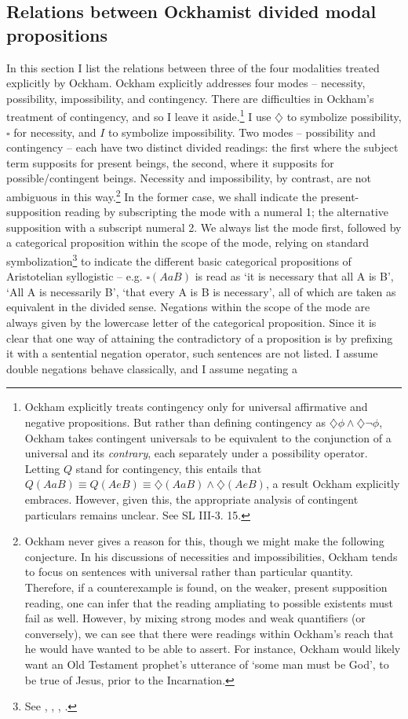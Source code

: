 \documentclass[a4paper]{article}
\begin{document}
\subsection{Relations between Ockhamist divided modal propositions}
In this section I list the relations between three of the four modalities treated explicitly by Ockham. Ockham explicitly addresses four modes – necessity, possibility, impossibility, and contingency. There are difficulties in Ockham's treatment of contingency, and so I leave it aside.\footnote{Ockham explicitly treats contingency only for universal affirmative and negative propositions. But rather than defining contingency as $\diamondsuit\phi \wedge \diamondsuit \neg \phi$, Ockham takes contingent universals to be equivalent to the conjunction of a universal and its \textit{contrary}, each separately under a possibility operator. Letting $Q$ stand for contingency, this entails that $Q(AaB) \equiv Q(AeB) \equiv \diamondsuit(AaB) \wedge \diamondsuit(AeB)$, a result Ockham explicitly embraces. However, given this, the appropriate analysis of contingent particulars remains unclear. See SL III-3. 15.}  I use $\diamondsuit$  to symbolize possibility, $\square$ for necessity, and $I$ to symbolize impossibility. Two modes – possibility and contingency – each have two distinct divided readings: the first where the subject term supposits for present beings, the second, where it supposits for possible/contingent beings. Necessity and impossibility, by contrast, are not ambiguous in this way.\footnote{Ockham never gives a reason for this, though we might make the following conjecture. In his discussions of necessities and impossibilities, Ockham tends to focus on sentences with universal rather than particular quantity. Therefore, if a counterexample is found, on the weaker, present supposition reading, one can infer that the reading ampliating to possible existents must fail as well. However, by mixing strong modes and weak quantifiers (or conversely), we can see that there were readings within Ockham’s reach that he would have wanted to be able to assert. For instance, Ockham would likely want an Old Testament prophet’s utterance of `some man must be God', to be true of Jesus, prior to the Incarnation.}  In the former case, we shall indicate the present-supposition reading by subscripting the mode with a numeral 1; the alternative supposition with a subscript numeral 2. We always list the mode first, followed by a categorical proposition within the scope of the mode, relying on standard symbolization\footnote{See \cite{Corcoran1972b}, \cite{AristotleSmith}, \cite{Uckelman2010b}, \cite{Johnston2015b}.} to indicate the different basic categorical propositions of Aristotelian syllogistic – e.g. $\square(AaB)$ is read as `it is necessary that all A is B', `All A is necessarily B', `that every A is B is necessary', all of which are taken as equivalent in the divided sense. Negations within the scope of the mode are always given by the lowercase letter of the categorical proposition. Since it is clear that one way of attaining the contradictory of a proposition is by prefixing it with a sentential negation operator, such sentences are not listed. I assume double negations behave classically, and I assume negating a 
\end{document}
